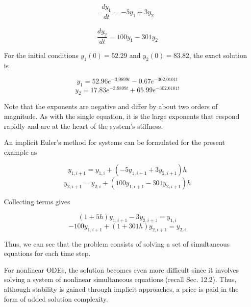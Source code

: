 \documentclass[../main.tex]{subfiles}
\begin{document}
\begin{equation}
    \tag{23.22a}
    \frac{d y_{1}}{d t}=-5 y_{1}+3 y_{2}
\end{equation}\
\begin{equation}
    \tag{23.22b}
    \frac{d y_{2}}{d t}=100 y_{1}-301 y_{2}
\end{equation}

\noindent For the initial conditions $y_{1}(0)=52.29$ and $y_{2}(0)=83.82$, the exact solution is

\begin{equation}
    \tag{23.23a}
    y_{1}=52.96 e^{-3.9899 t}-0.67 e^{-302.0101 t}
\end{equation}
\begin{equation}
    \tag{23.23b}
    y_{2}=17.83 e^{-3.9899 t}+65.99 e^{-302.0101 t}
\end{equation}

\noindent Note that the exponents are negative and differ by about two orders of magnitude. As with the single equation, it is the large exponents that respond rapidly and are at the heart of the system's stiffness.

An implicit Euler's method for systems can be formulated for the present example as

\begin{equation}
    \tag{23.24a}
    y_{1, i+1}=y_{1, i}+\left(-5 y_{1, i+1}+3 y_{2, i+1}\right) h 
\end{equation}
\begin{equation}
    \tag{23.24b}
    y_{2, i+1}=y_{2, i}+\left(100 y_{1, i+1}-301 y_{2, i+1}\right) h
\end{equation}

\noindent Collecting terms gives

\begin{equation}
    \tag{23.25a}
(1+5 h) y_{1, i+1}-3 y_{2, i+1}=y_{1, i} 
\end{equation}
\begin{equation}
    \tag{23.25b}
    -100 y_{1, i+1}+(1+301 h) y_{2, i+1}=y_{2, i}
\end{equation}

\noindent Thus, we can see that the problem consists of solving a set of simultaneous equations for each time step.

For nonlinear ODEs, the solution becomes even more difficult since it involves solving a system of nonlinear simultaneous equations (recall Sec. 12.2). Thus, although stability is gained through implicit approaches, a price is paid in the form of added solution complexity.
\texttt{}
\end{document}
